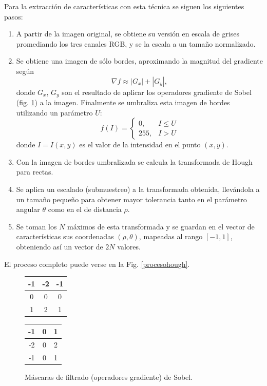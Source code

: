 \documentclass[conference,a4paper,10pt,oneside,final]{tfmpd}
\begin{document}
Para la extracción de características con esta técnica se siguen los siguientes
pasos:
\begin{enumerate}
\item A partir de la imagen original, se obtiene su versión en escala de grises
      promediando los tres canales RGB, y se la escala a un tamaño normalizado.
\item Se obtiene una imagen de sólo bordes, aproximando la magnitud del
      gradiente según
      \begin{equation}
      \label{sob}
      \nabla f \approx |G_x| + |G_y|,
      \end{equation}
      donde $G_x$, $G_y$ son el resultado de aplicar los o\-pe\-ra\-do\-res
      gradiente  de Sobel \cite{gonzalez+woods} (fig. \ref{masksobel}) a la
      imagen.
      Finalmente se umbraliza esta imagen de bordes utilizando un parámetro $U$:
      \begin{equation}
      \label{umbral}
      f(I)=
      \begin{cases}
      0, & I\leq U\\
      255, & I > U
      \end{cases}
      \end{equation}
      {donde $I=I(x,y)$ es el valor de la intensidad en el punto $(x,y)$.}
\item Con la imagen de bordes umbralizada se calcula la transformada de
      Hough para rectas.
\item Se aplica un escalado (submuestreo) a la transformada obtenida, llevándola
      a un tamaño pequeño
      para obtener mayor tolerancia tanto en el parámetro angular
      $\theta$ como en el de distancia $\rho$.
\item Se toman los $N$ máximos de esta transformada y se guardan en el vector de
      características sus coordenadas $(\rho,\theta)$, mapeadas al rango
      $[-1,1]$, obteniendo así un vector de $2N$ valores.
\end{enumerate}
El proceso completo puede verse en la Fig. \ref{procesohough}.
\begin{figure}
\begin{center}
\begin{tabular}{|c|c|c|}
\hline -1 & -2 & -1 \\\hline 0 & 0 & 0 \\\hline 1 & 2 & 1 \\\hline
\end{tabular}
\begin{tabular}{|c|c|c|}
\hline -1 & 0 & 1 \\\hline -2 & 0 & 2 \\\hline -1 & 0 & 1 \\\hline
\end{tabular}
\end{center}
\caption{Máscaras de filtrado (operadores gradiente) de Sobel.}
\label{masksobel}
\end{figure}
\end{document}
